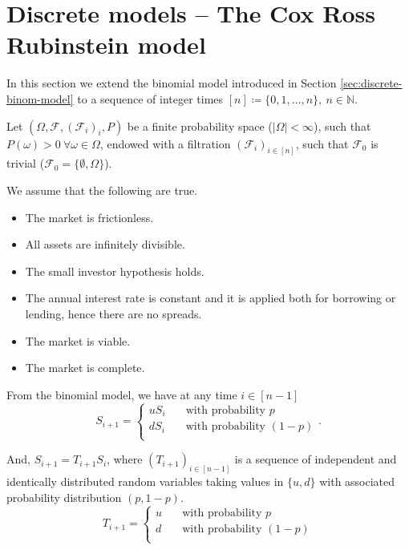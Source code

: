 \section{Discrete models -- The Cox Ross Rubinstein model}
\label{sec:discrete-cox-ross-rubinstein}

In this section we extend the binomial model introduced in Section \ref{sec:discrete-binom-model} to a sequence of integer times $ [n] \coloneqq \{ 0, 1, \dots, n \}, \  n \in \mathbb{N} $.

Let $ (\Omega, \mathcal{F}, (\mathcal{F}_i)_i, P) $ be a finite probability space ($ |\Omega| < \infty $), such that $ P(\omega) > 0 \  \forall \omega \in \Omega $, endowed with a filtration $ (\mathcal{F}_i)_{i \in [n]} $, such that $ \mathcal{F}_0 $ is trivial ($ \mathcal{F}_0 = \{ \emptyset, \Omega \} $).

We assume that the following are true.
\begin{itemize}
	\item The market is frictionless.
	\item All assets are infinitely divisible.
	\item The small investor hypothesis holds.
	\item The annual interest rate is constant and it is applied both for borrowing or lending, hence there are no spreads.
	\item The market is viable.
	\item The market is complete.
\end{itemize}


From the binomial model, we have at any time $ i \in [n-1] $
\begin{equation*}
	S_{i + 1} =
	\begin{cases}
		u S_i & \quad \text{with probability } p \\
		d S_i & \quad \text{with probability } (1 - p) \\		
	\end{cases}.
\end{equation*}

And, $ S_{i+1} = T_{i+1} S_i $, where $ (T_{i+1})_{i \in [n-1]} $ is a sequence of independent and identically distributed random variables taking values in $ \{ u, d \} $ with associated probability distribution $ (p, 1-p) $.
\begin{equation*}
	T_{i+1} =
	\begin{cases}
		u  & \quad \text{with probability } p \\
		d  & \quad \text{with probability } (1 - p) \\		
	\end{cases}
\end{equation*}

